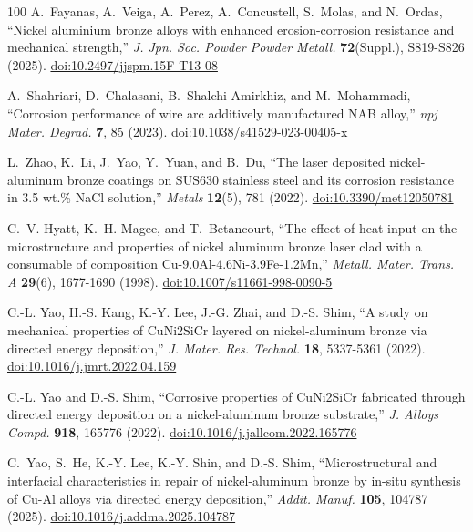 \documentclass[12pt,letterpaper]{article}
\begin{document}
\begin{thebibliography}{100}
A.~Fayanas, A.~Veiga, A.~Perez, A.~Concustell, S.~Molas, and N.~Ordas, ``Nickel aluminium bronze alloys with enhanced erosion-corrosion resistance and mechanical strength,'' \emph{J. Jpn. Soc. Powder Powder Metall.} \textbf{72}(Suppl.), S819-S826 (2025).
\href{https://doi.org/10.2497/jjspm.15F-T13-08}{doi:10.2497/jjspm.15F-T13-08}

A.~Shahriari, D.~Chalasani, B.~Shalchi Amirkhiz, and M.~Mohammadi, ``Corrosion performance of wire arc additively manufactured NAB alloy,'' \emph{npj Mater. Degrad.} \textbf{7}, 85 (2023).
\href{https://doi.org/10.1038/s41529-023-00405-x}{doi:10.1038/s41529-023-00405-x}

L.~Zhao, K.~Li, J.~Yao, Y.~Yuan, and B.~Du, ``The laser deposited nickel-aluminum bronze coatings on SUS630 stainless steel and its corrosion resistance in 3.5 wt.\% NaCl solution,'' \emph{Metals} \textbf{12}(5), 781 (2022).
\href{https://doi.org/10.3390/met12050781}{doi:10.3390/met12050781}

C.~V. Hyatt, K.~H. Magee, and T.~Betancourt, ``The effect of heat input on the microstructure and properties of nickel aluminum bronze laser clad with a consumable of composition Cu-9.0Al-4.6Ni-3.9Fe-1.2Mn,'' \emph{Metall. Mater. Trans. A} \textbf{29}(6), 1677-1690 (1998).
\href{https://doi.org/10.1007/s11661-998-0090-5}{doi:10.1007/s11661-998-0090-5}

C.-L. Yao, H.-S. Kang, K.-Y. Lee, J.-G. Zhai, and D.-S. Shim, ``A study on mechanical properties of CuNi2SiCr layered on nickel-aluminum bronze via directed energy deposition,'' \emph{J. Mater. Res. Technol.} \textbf{18}, 5337-5361 (2022).
\href{https://doi.org/10.1016/j.jmrt.2022.04.159}{doi:10.1016/j.jmrt.2022.04.159}

C.-L. Yao and D.-S. Shim, ``Corrosive properties of CuNi2SiCr fabricated through directed energy deposition on a nickel-aluminum bronze substrate,'' \emph{J. Alloys Compd.} \textbf{918}, 165776 (2022).
\href{https://doi.org/10.1016/j.jallcom.2022.165776}{doi:10.1016/j.jallcom.2022.165776}

C.~Yao, S.~He, K.-Y. Lee, K.-Y. Shin, and D.-S. Shim, ``Microstructural and interfacial characteristics in repair of nickel-aluminum bronze by in-situ synthesis of Cu-Al alloys via directed energy deposition,'' \emph{Addit. Manuf.} \textbf{105}, 104787 (2025).
\href{https://doi.org/10.1016/j.addma.2025.104787}{doi:10.1016/j.addma.2025.104787}


\end{thebibliography}
\end{document}
